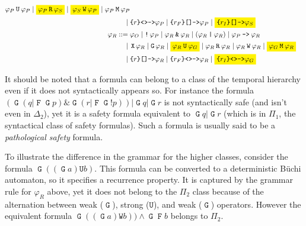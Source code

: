 \documentclass[a4paper,twoside,10pt,DIV=12]{scrreprt}
\DeclareMathOperator{\F}{\texttt{F}}
\DeclareMathOperator{\G}{\texttt{G}}
\newcommand{\U}{\mathbin{\texttt{U}}}
\newcommand{\R}{\mathbin{\texttt{R}}}
\DeclareMathOperator{\X}{\texttt{X}}
\newcommand{\M}{\mathbin{\texttt{M}}}
\newcommand{\W}{\mathbin{\texttt{W}}}
\DeclareMathOperator{\NOT}{\texttt{!}}
\newcommand{\IMPLIES}{\mathbin{\texttt{->}}}
\newcommand{\OR}{\mathbin{\texttt{|}}}
\newcommand{\AND}{\mathbin{\texttt{\&}}}
\newcommand{\0}{\texttt{0}}
\newcommand{\1}{\texttt{1}}
\newcommand{\Esuffix}{\texttt{<>->}}
\newcommand{\Asuffix}{\texttt{[]->}}
\newcommand{\sere}[1]{\texttt{\{}#1\texttt{\}}}
\begin{document}
\begin{align*}
                   \varphi_P\U\varphi_P\mid\colorbox{yellow}{$\varphi_P\R\varphi_S$}\mid
                   \colorbox{yellow}{$\varphi_S\W\varphi_P$}\mid\varphi_P\M\varphi_P\\
           \mid{}& \sere{r}\Esuffix \varphi_P\mid
                   \sere{r_F}\Asuffix \varphi_P\mid
                   \colorbox{yellow}{$\sere{r_I}\Asuffix \varphi_S$}\\
  \varphi_R ::={}& \varphi_O \mid \NOT\varphi_P\mid
                   \varphi_R\AND \varphi_R\mid (\varphi_R\OR \varphi_R)\mid
                   \varphi_P\IMPLIES \varphi_R\\
           \mid{}& \X\varphi_R \mid \G\varphi_R \mid
                   \colorbox{yellow}{$\varphi_R\U\varphi_G$}\mid\varphi_R\R\varphi_R\mid
                   \varphi_R\W\varphi_R\mid\colorbox{yellow}{$\varphi_G\M\varphi_R$}\\
           \mid{}& \sere{r}\Asuffix \varphi_R\mid \sere{r_F}\Esuffix \varphi_R \mid \colorbox{yellow}{$\sere{r_I}\Esuffix \varphi_G$}
\end{align*}


It should be noted that a formula can belong to a class of the
temporal hierarchy even if it does not syntactically appears so.  For
instance the formula
$(\G(q\OR \F\G p)\AND \G(r\OR \F\G\NOT p))\OR\G q\OR \G r$ is not
syntactically safe (and isn't even in $\Delta_2$), yet it is a safety
formula equivalent to $\G q\OR \G r$ (which is in $\Pi_1$, the
syntactical class of safety formulas).  Such a formula is usually said
to be a \emph{pathological safety} formula.

To illustrate the difference in the grammar for the higher classes,
consider the formula $\G((\G a) \U b)$.  This formula can be converted
to a deterministic Büchi automaton, so it specifies a recurrence
property.  It is captured by the grammar rule for $\varphi_R$ above,
yet it does not belong to the $\Pi_2$ class because of the alternation
between weak ($\G$), strong ($\U$), and weak ($\G$) operators.
However the equivalent formula $\G((\G a) \W b))\land \G\F b$ belongs
to $\Pi_2$.
\end{document}
